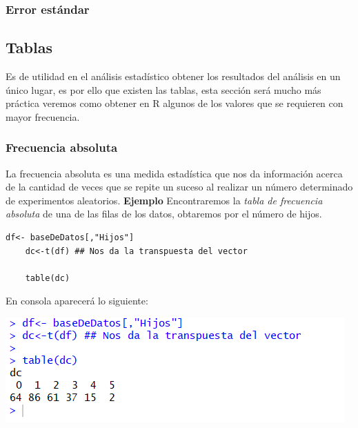 \documentclass[12pt,hidelinks]{article}
\begin{document}
	\subsubsection{Error estándar}
	
	\subsection{Tablas}
	Es de utilidad en el análisis estadístico obtener los resultados del análisis en un único lugar, es por ello que existen las tablas, esta sección será mucho más práctica veremos como obtener en R algunos de los valores que se requieren con mayor frecuencia.
	\subsubsection{Frecuencia absoluta}
	La frecuencia absoluta es una medida estadística que nos da información acerca de la cantidad de veces que se repite un suceso al realizar un número determinado de experimentos aleatorios. \textbf{Ejemplo} Encontraremos la \textit{tabla de frecuencia absoluta} de una de las filas de los datos, obtaremos por el número de hijos.
	\begin{lstlisting}[frame=single]
	df<- baseDeDatos[,"Hijos"]
	dc<-t(df) ## Nos da la transpuesta del vector
	
	table(dc)
	\end{lstlisting}
	En consola aparecerá lo siguiente:
	\begin{center}
		\includegraphics[width = \linewidth]{images/2/TFabsoluta.PNG}
	\end{center}
\end{document}
